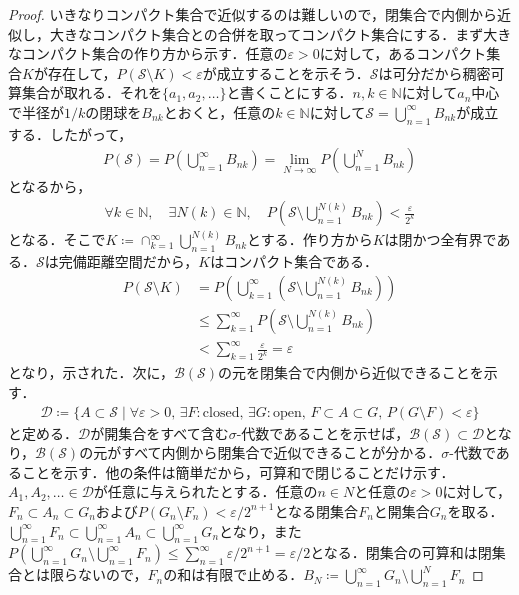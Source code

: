 \documentclass[dvipdfmx,autodetect-engine]{jsarticle}
\theoremstyle{remark}
\theoremstyle{definition}
\newcommand{\N}{\mathbb{N}}
\begin{document}
    
    \begin{proof}
    いきなりコンパクト集合で近似するのは難しいので，閉集合で内側から近似し，大きなコンパクト集合との合併を取ってコンパクト集合にする．まず大きなコンパクト集合の作り方から示す．任意の$\varepsilon >0$に対して，あるコンパクト集合$K$が存在して，$P(\mathcal{S}\setminus K)<\varepsilon$が成立することを示そう．$\mathcal{S}$は可分だから稠密可算集合が取れる．それを$\{a_1,a_2,\ldots \}$と書くことにする．$n,k \in \N$に対して$a_n$中心で半径が$1/k$の閉球を$B_{nk}$とおくと，任意の$k \in \N$に対して$\mathcal{S} = \bigcup_{n=1}^{\infty} B_{nk}$が成立する．したがって，
    \begin{align}
        P(\mathcal{S}) = P\left(\bigcup_{n=1}^{\infty}B_{nk}\right) = \lim_{N \to \infty} P\left(\bigcup_{n=1}^{N} B_{nk}\right)
    \end{align}
    となるから，
    \begin{align}
        \forall k \in \N,\quad \exists N(k) \in \N,\quad P\left(\mathcal{S} \setminus \bigcup_{n=1}^{N(k)} B_{nk}\right) < \frac{\varepsilon}{2^k}
    \end{align}
    となる．そこで$K \coloneqq \cap_{k=1}^{\infty} \bigcup_{n=1}^{N(k)} B_{nk}$とする．作り方から$K$は閉かつ全有界である．$\mathcal{S}$は完備距離空間だから，$K$はコンパクト集合である．
    \begin{align*}
        P(\mathcal{S}\setminus K) &= P\left(\bigcup_{k=1}^{\infty}\left(\mathcal{S} \setminus \bigcup_{n=1}^{N(k)} B_{nk}\right)\right) \\
        &\leq \sum_{k=1}^{\infty} P\left(\mathcal{S} \setminus \bigcup_{n=1}^{N(k)} B_{nk}\right) \\
        &< \sum_{k=1}^{\infty} \frac{\varepsilon}{2^k} = \varepsilon
    \end{align*}
    となり，示された．次に，$\mathcal{B}(\mathcal{S})$の元を閉集合で内側から近似できることを示す．
    \begin{align*}
        \mathcal{D} \coloneqq \{A \subset \mathcal{S} \mid \forall \varepsilon>0,\, \exists F:\text{closed},\,\exists G:\text{open},\,F \subset A \subset G,\, P(G\setminus F) <\varepsilon \}
    \end{align*}
    と定める．$\mathcal{D}$が開集合をすべて含む$\sigma$-代数であることを示せば，$\mathcal{B}(\mathcal{S}) \subset \mathcal{D}$となり，$\mathcal{B}(\mathcal{S})$の元がすべて内側から閉集合で近似できることが分かる．$\sigma$-代数であることを示す．他の条件は簡単だから，可算和で閉じることだけ示す．$A_1,A_2,\ldots \in \mathcal{D}$が任意に与えられたとする．任意の$n \in N$と任意の$\varepsilon > 0$に対して，$F_n \subset A_n \subset G_n$および$P(G_n \setminus F_n) < \varepsilon / 2^{n+1}$となる閉集合$F_n$と開集合$G_n$を取る．$\bigcup_{n=1}^{\infty} F_n \subset \bigcup_{n=1}^{\infty} A_n \subset \bigcup_{n=1}^{\infty} G_n$となり，また$P(\bigcup_{n=1}^{\infty}G_n \setminus \bigcup_{n=1}^{\infty} F_n ) \leq \sum_{n=1}^{\infty} \varepsilon / 2^{n+1} =  \varepsilon /2$となる．閉集合の可算和は閉集合とは限らないので，$F_n$の和は有限で止める．$B_N \coloneqq \bigcup_{n=1}^{\infty}G_n \setminus \bigcup_{n=1}^{N} F_n$

\end{proof}
\end{document}
